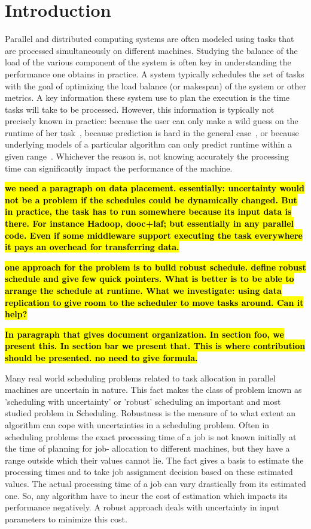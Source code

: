 \documentclass[10pt, conference, compsocconf]{IEEEtran}
\newcommand{\todo}[1]{{\color{red}\textbf{\hl{#1}}\xspace}}
\begin{document}
\IEEEpeerreviewmaketitle

\section{Introduction}

Parallel and distributed computing systems are often modeled using
tasks that are processed simultaneously on different
machines. Studying the balance of the load of the various component of
the system is often key in understanding the performance one obtains
in practice. A system typically schedules the set of tasks with the
goal of optimizing the load balance (or makespan) of the system or
other metrics. A key information these system use to plan the
execution is the time tasks will take to be processed. However, this
information is typically not precisely known in practice: because the
user can only make a wild guess on the runtime of her
task~\cite{Luong2008}, because prediction is hard in the general
case~\cite{Wilhelm2008}, or because underlying models of a particular
algorithm can only predict runtime within a given
range~\cite{Erlebacher14-ICS}. Whichever the reason is, not knowing
accurately the processing time can significantly impact the
performance of the machine.


\todo{we need a paragraph on data placement. essentially: uncertainty
  would not be a problem if the schedules could be dynamically
  changed. But in practice, the task has to run somewhere because its
  input data is there. For instance Hadoop, dooc+laf; but essentially
  in any parallel code. Even if some middleware support executing the
  task everywhere it pays an overhead for transferring data.}

\todo{one approach for the problem is to build robust schedule. define
  robust schedule and give few quick pointers. What is better is to be
  able to arrange the schedule at runtime. What we investigate: using
  data replication to give room to the scheduler to move tasks
  around. Can it help?}

\todo{In paragraph that gives document organization. In section foo,
  we present this. In section bar we present that. This is where
  contribution should be presented. no need to give formula.}

Many real world scheduling problems related to task allocation in
parallel machines are uncertain in nature. This fact makes the class
of problem known as 'scheduling with uncertainty' or 'robust'
scheduling an important and most studied problem in
Scheduling. Robustness is the measure of to what extent an algorithm
can cope with uncertainties in a scheduling problem. Often in
scheduling problems the exact processing time of a job is not known
initially at the time of planning for job- allocation to different
machines, but they have a range outside which their values cannot
lie. The fact gives a basis to estimate the processing times and to
take job assignment decision based on these estimated values. The
actual processing time of a job can vary drastically from its
estimated one. So, any algorithm have to incur the cost of estimation
which impacts its performance negatively. A robust approach deals with
uncertainty in input parameters to minimize this cost.
\end{document}
